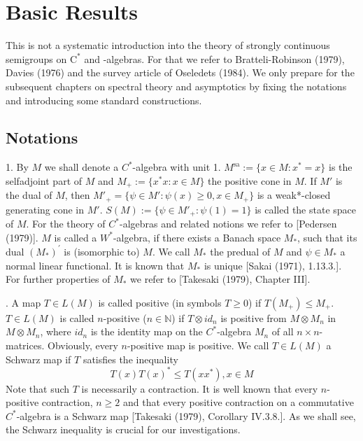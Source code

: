 \chapter{Basic Results}%
This is not a systematic introduction into the theory of strongly continuous semigroups on $\mathrm{C}^{*}$ and \WA-algebras.
For that we refer to Bratteli-Robinson (1979), Davies (1976) and the survey article of Oseledets (1984).
We only prepare for the subsequent chapters on spectral theory and asymptotics by fixing the notations and introducing some standard constructions.
\section{Notations}
1. By $M$ we shall denote a $C^{*}$-algebra with unit 1.
$M^{\text{sa}} := \{x \in M : x^{*} = x\}$ is the selfadjoint part of $M$ and $M_{+} := \{x^{*} x : x \in M\}$ the positive cone in $M$.
If $M'$ is the dual of $M$, then $M'_{+} = \{\psi \in M' : \psi(x) \geq 0, x \in M_{+}\}$ is a weak*-closed generating cone in $M'$.
$S(M) := \{\psi \in M'_{+} : \psi(1) = 1\}$ is called the state space of $M$.
For the theory of $C^{*}$-algebras and related notions we refer to [Pedersen (1979)].
$M$ is called a $W^{*}$-algebra, if there exists a Banach space $M_{*}$, such that its dual $(M_{*})^{'}$ is (isomorphic to) $M$.
We call $M_{*}$ the predual of $M$ and $\psi \in M_{*}$ a normal linear functional.
It is known that $M_{*}$ is unique [Sakai (1971), 1.13.3.].
For further properties of $M_{*}$ we refer to [Takesaki (1979), Chapter III].

\smallskip
{}. A map $T \in L(M)$ is called positive (in symbols $T \geq 0$) if $T(M_{+}) \leq M_{+}$.
$T \in L(M)$ is called $n$-positive ($n \in \mathbb{N}$) if $T \otimes id_n$ is positive from $M \otimes M_n$ in $M \otimes M_n$, where $id_n$ is the identity map on the $C^{*}$-algebra $M_n$ of all $n \times n$-matrices.
Obviously, every $n$-positive map is positive.
We call $T \in L(M)$ a Schwarz map if $T$ satisfies the inequality
\[
T(x)T(x)^{*} \leq T(xx^{*}), x \in M
\]
Note that such $T$ is necessarily a contraction.
It is well known that every $n$-positive contraction, $n \geq 2$ and that every positive contraction on a commutative $C^{*}$-algebra is a Schwarz map [Takesaki (1979), Corollary IV.3.8.].
As we shall see, the Schwarz inequality is crucial for our investigations.

